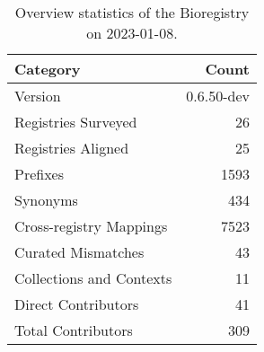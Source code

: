 \begin{table}
\centering
\caption{Overview statistics of the Bioregistry on 2023-01-08.}
\label{tab:bioregistry-summary}
\begin{tabular}{lr}
\toprule
                Category &      Count \\
\midrule
                 Version & 0.6.50-dev \\
     Registries Surveyed &         26 \\
      Registries Aligned &         25 \\
                Prefixes &       1593 \\
                Synonyms &        434 \\
 Cross-registry Mappings &       7523 \\
      Curated Mismatches &         43 \\
Collections and Contexts &         11 \\
     Direct Contributors &         41 \\
      Total Contributors &        309 \\
\bottomrule
\end{tabular}
\end{table}

